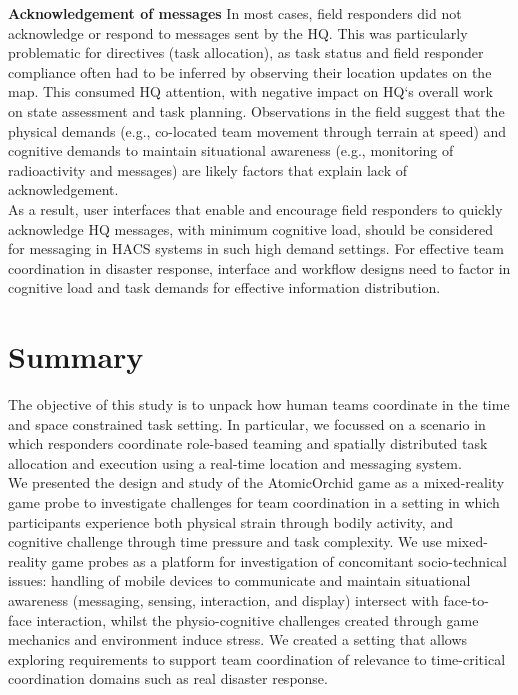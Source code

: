 \textbf{Acknowledgement of messages} In most cases, field responders did not acknowledge or respond to messages sent by the HQ. This was particularly problematic for directives (task allocation), as task status and field responder compliance often had to be inferred by observing their location updates on the map. This consumed HQ attention, with negative impact on HQ`s overall work on state assessment and task planning. Observations in the field suggest that the physical demands (e.g., co-located team movement through terrain at speed) and cognitive demands to maintain situational awareness (e.g., monitoring of radioactivity and messages) are likely factors that explain lack of acknowledgement.\\


As a result, user interfaces that enable and encourage field responders to quickly acknowledge HQ messages, with minimum cognitive load, should be considered for messaging in \ac{HACS} systems in such high demand settings. For effective team coordination in disaster response, interface and workflow designs need to factor in cognitive load and task demands for effective information distribution.\\


\section{Summary}
The objective of this study is to unpack how human teams coordinate in the time and space constrained task setting. In particular, we focussed on a scenario in which responders coordinate role-based teaming and spatially distributed task allocation and execution using a real-time location and messaging system.\\

We presented the design and study of the AtomicOrchid game as a mixed-reality game probe to investigate challenges for team coordination in a setting in which participants experience both physical strain through bodily activity, and cognitive challenge through time pressure and task complexity. We  use mixed-reality game probes as a platform for investigation of concomitant socio-technical issues: handling of mobile devices to communicate and maintain situational awareness (messaging, sensing, interaction, and display) intersect with face-to-face interaction, whilst the physio-cognitive challenges created through game mechanics and environment induce stress. We created a setting that allows exploring requirements to support team coordination of relevance to time-critical coordination domains such as real disaster response.\\

